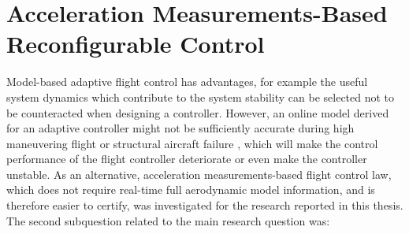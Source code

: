 \section{Acceleration Measurements-Based Reconfigurable Control}
\label{sec:04concl}
Model-based adaptive flight control has advantages, for example the useful system dynamics which contribute to the system stability can be selected not to be counteracted when designing a controller. However, an online model derived for an adaptive controller might not be sufficiently accurate during high maneuvering flight or structural aircraft failure \cite{lombaert2010}, which will make the control performance of the flight controller deteriorate or even make the controller unstable. As an alternative, acceleration measurements-based flight control law, which does not require real-time full aerodynamic model information, and is therefore easier to certify, was investigated for the research reported in this thesis.
The second subquestion related to the main research question was:\\

\vspace{-0.5cm}
\begin{shaded}
\end{shaded}
\vspace{-0.98cm}
\begin{shaded}
\end{shaded}

